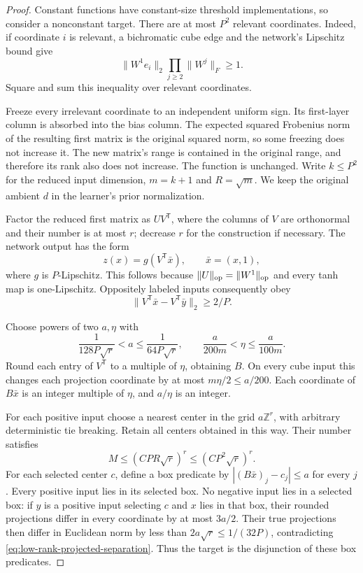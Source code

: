 \begin{proof}
Constant functions have constant-size threshold implementations, so
consider a nonconstant target. There are at most $P^2$ relevant
coordinates. Indeed, if coordinate $i$ is relevant, a bichromatic
cube edge and the network's Lipschitz bound give
\[
 \|W^1e_i\|_2\prod_{j\ge2}\|W^j\|_F\ge1.
\]
Square and sum this inequality over relevant coordinates.

Freeze every irrelevant coordinate to an independent uniform sign.
Its first-layer column is absorbed into the bias column. The expected
squared Frobenius norm of the resulting first matrix is the original
squared norm, so some freezing does not increase it. The new matrix's
range is contained in the original range, and therefore its rank
also does not increase. The function is unchanged. Write $k\le P^2$
for the reduced input dimension, $m=k+1$ and $R=\sqrt m$.
We keep the original ambient $d$ in the learner's prior normalization.

Factor the reduced first matrix as $UV^{\mathsf T}$, where the columns
of $V$ are orthonormal and their number is at most $r$; decrease $r$
for the construction if necessary. The network output has the form
\[
 z(x)=g(V^{\mathsf T}\bar x),\qquad \bar x=(x,1),
\]
where $g$ is $P$-Lipschitz. This follows because
$\|U\|_{\rm op}=\|W^1\|_{\rm op}$ and every tanh map is
one-Lipschitz. Oppositely labeled inputs consequently obey
\begin{equation}\label{eq:low-rank-projected-separation}
 \|V^{\mathsf T}\bar x-V^{\mathsf T}\bar y\|_2\ge2/P.
\end{equation}

Choose powers of two $a,\eta$ with
\[
 \frac1{128P\sqrt r}<a\le\frac1{64P\sqrt r},\qquad
 \frac{a}{200m}<\eta\le\frac{a}{100m}.
\]
Round each entry of $V^{\mathsf T}$ to a multiple of $\eta$, obtaining
$B$. On every cube input this changes each projection coordinate by
at most $m\eta/2\le a/200$. Each coordinate of $B\bar x$ is an
integer multiple of $\eta$, and $a/\eta$ is an integer.

For each positive input choose a nearest center in the grid
$a\mathbb Z^r$, with arbitrary deterministic tie breaking. Retain
all centers obtained in this way. Their number satisfies
\[
 M\le(CPR\sqrt r)^r\le(CP^2\sqrt r)^r.
\]
For each selected center $c$, define a box predicate by
$|(B\bar x)_j-c_j|\le a$ for every $j$. Every positive input lies
in its selected box. No negative input lies in a selected box:
if $y$ is a positive input selecting $c$ and $x$ lies in that box,
their rounded projections differ in every coordinate by at most
$3a/2$. Their true projections then differ in Euclidean norm by less
than $2a\sqrt r\le1/(32P)$, contradicting
\eqref{eq:low-rank-projected-separation}.
Thus the target is the disjunction of these box predicates.


\end{proof}
